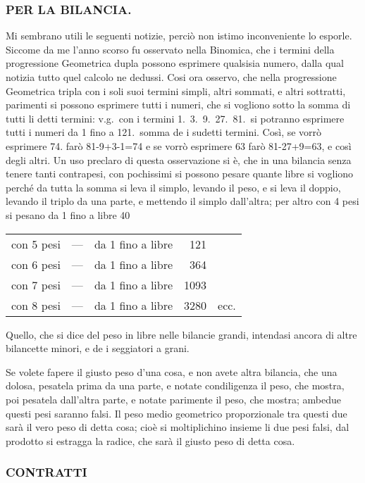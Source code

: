 \documentclass[11pt,a6paper]{article}
\begin{document}
\subsubsection{PER LA BILANCIA.}

Mi sembrano utili le seguenti notizie, perciò
non istimo inconveniente lo esporle. Siccome
da me l'anno scorso fu osservato nella Binomica,
che i termini della progressione Geometrica dupla
possono esprimere qualsisia numero, dalla qual notizia
tutto quel calcolo ne dedussi. Cosi ora osservo,
che nella progressione Geometrica tripla con i soli
suoi termini simpli, altri sommati, e altri
sottratti, parimenti si possono esprimere tutti i
numeri, che si vogliono sotto la somma di tutti li detti
termini: v.g.\ con i termini 1.\ 3.\ 9.\ 27.\ 81.\ si
potranno esprimere tutti i numeri da 1 fino a 121.\ somma
de i sudetti termini. Così, se vorrò esprimere 74.
farò 81-9+3-1=74 e se vorrò esprimere 63 farò
81-27+9=63, e così degli altri. Un uso preclaro di
questa osservazione si è, che in una bilancia senza
tenere tanti contrapesi, con pochissimi si possono
pesare quante libre si vogliono perché da tutta la somma
si leva il simplo, levando il peso, e si leva il doppio,
levando il triplo da una parte, e mettendo il simplo dall'altra; per
altro con 4 pesi si pesano da 1 fino a libre 40
\begin{tabular}{l@{ }c@{ }l@{ }r@{ }l}
con 5 pesi &—& da 1 fino a libre& 121\\
con 6 pesi &—& da 1 fino a libre& 364\\
con 7 pesi &—& da 1 fino a libre& 1093\\
con 8 pesi &—& da 1 fino a libre& 3280&ecc.
\end{tabular}

Quello, che si dice del peso in libre nelle bilancie
grandi, intendasi ancora di altre bilancette minori,
e de i seggiatori a grani.

Se
volete fapere il giusto peso d'una cosa, e non
avete altra bilancia, che una dolosa, pesatela prima
da una parte, e notate condiligenza il peso, che
mostra, poi pesatela dall'altra parte, e notate
parimente il peso, che mostra; ambedue questi pesi
saranno falsi. Il peso medio geometrico proporzionale
tra questi due sarà il vero peso di detta cosa;
cioè si moltiplichino insieme li due pesi falsi, dal
prodotto si estragga la radice, che sarà il giusto peso
di detta cosa.

\subsubsection{CONTRATTI}
\end{document}
